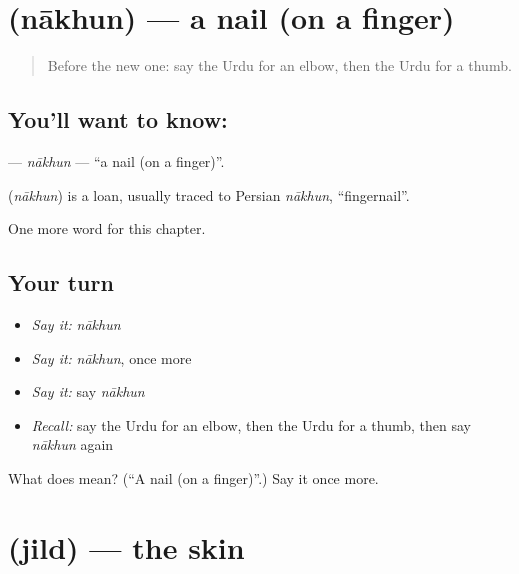 \section[\texorpdfstring{\ur{ناخن} (nākhun)}{ناخن (nākhun)}]{ (nākhun) — a nail (on a finger)}

\label{lesson:UR-C130-nakhun}



\begin{quote}
Before the new one: say the Urdu for an elbow, then the Urdu for a thumb.
\end{quote}

\subsection*{You'll want to know: }
\textbf{} — \emph{nākhun} — \textquotedblleft{}a nail (on a finger)\textquotedblright{}.

\begin{cousinweb}
\textbf{} (\emph{nākhun}) is a loan, usually traced to Persian \emph{nākhun}, \textquotedblleft{}fingernail\textquotedblright{}.
\end{cousinweb}

\begin{grammarlens}[title={What you've built}]
One more word for this chapter.
\end{grammarlens}

\subsection*{Your turn}
\begin{itemize}
\raggedright
  \item \emph{Say it:} \emph{nākhun}
  \item \emph{Say it:} \emph{nākhun}, once more
  \item \emph{Say it:} say \emph{nākhun}
  \item \emph{Recall:} say the Urdu for an elbow, then the Urdu for a thumb, then say \emph{nākhun} again
\end{itemize}

\begin{tcolorbox}[breakable,colback=teal!4,colframe=teal!35!black,title={Before you move on}]
What does  mean? (\textquotedblleft{}A nail (on a finger)\textquotedblright{}.) Say it once more.
\end{tcolorbox}
\section[\texorpdfstring{\ur{جلد} (jild)}{جلد (jild)}]{ (jild) — the skin}

